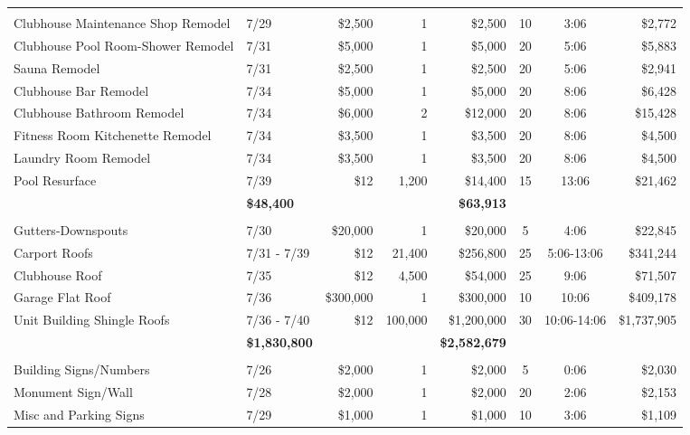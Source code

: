 \documentclass[11pt,letterpaper]{article}
\begin{document}
\begin{longtable}{p{4.2cm} p{1.6cm} r r r c c r}
\addlinespace[6pt]
\multicolumn{8}{l}{\textbf{Renovation}} \\
Clubhouse Maintenance Shop Remodel & 7/29 & \$2,500 & 1 & \$2,500 & 10 & 3:06 & \$2,772 \\
\rowcolor{blue!12} Clubhouse Pool Room-Shower Remodel & 7/31 & \$5,000 & 1 & \$5,000 & 20 & 5:06 & \$5,883 \\
Sauna Remodel & 7/31 & \$2,500 & 1 & \$2,500 & 20 & 5:06 & \$2,941 \\
\rowcolor{blue!12} Clubhouse Bar Remodel & 7/34 & \$5,000 & 1 & \$5,000 & 20 & 8:06 & \$6,428 \\
Clubhouse Bathroom Remodel & 7/34 & \$6,000 & 2 & \$12,000 & 20 & 8:06 & \$15,428 \\
\rowcolor{blue!12} Fitness Room Kitchenette Remodel & 7/34 & \$3,500 & 1 & \$3,500 & 20 & 8:06 & \$4,500 \\
Laundry Room Remodel & 7/34 & \$3,500 & 1 & \$3,500 & 20 & 8:06 & \$4,500 \\
\rowcolor{blue!12} Pool Resurface & 7/39 & \$12 & 1,200 & \$14,400 & 15 & 13:06 & \$21,462 \\
\addlinespace[1pt] \multicolumn{4}{r}{} & \textbf{\$48,400} & & & \textbf{\$63,913} \\
\addlinespace[6pt]
\multicolumn{8}{l}{\textbf{Roofing}} \\
Gutters-Downspouts & 7/30 & \$20,000 & 1 & \$20,000 & 5 & 4:06 & \$22,845 \\
\rowcolor{blue!12} Carport Roofs & 7/31 - 7/39 & \$12 & 21,400 & \$256,800 & 25 & 5:06-13:06 & \$341,244 \\
Clubhouse Roof & 7/35 & \$12 & 4,500 & \$54,000 & 25 & 9:06 & \$71,507 \\
\rowcolor{blue!12} Garage Flat Roof & 7/36 & \$300,000 & 1 & \$300,000 & 10 & 10:06 & \$409,178 \\
Unit Building Shingle Roofs & 7/36 - 7/40 & \$12 & 100,000 & \$1,200,000 & 30 & 10:06-14:06 & \$1,737,905 \\
\addlinespace[1pt] \multicolumn{4}{r}{} & \textbf{\$1,830,800} & & & \textbf{\$2,582,679} \\
\addlinespace[6pt]
\multicolumn{8}{l}{\textbf{Signage}} \\
\rowcolor{blue!12} Building Signs/Numbers & 7/26 & \$2,000 & 1 & \$2,000 & 5 & 0:06 & \$2,030 \\
Monument Sign/Wall & 7/28 & \$2,000 & 1 & \$2,000 & 20 & 2:06 & \$2,153 \\
\rowcolor{blue!12} Misc and Parking Signs & 7/29 & \$1,000 & 1 & \$1,000 & 10 & 3:06 & \$1,109 \\

\end{longtable}
\end{document}
